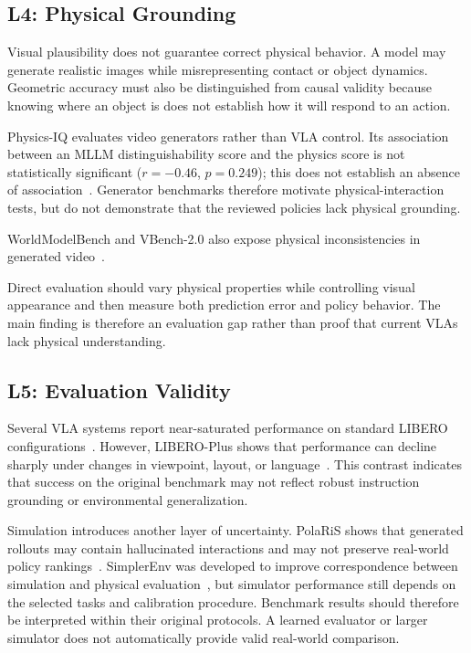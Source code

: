 \documentclass{ieeeaccess}
\begin{document}
\subsection{L4: Physical Grounding}
\label{sec:l4}

Visual plausibility does not guarantee correct physical behavior. A model may generate realistic images while misrepresenting contact or object dynamics. Geometric accuracy must also be distinguished from causal validity because knowing where an object is does not establish how it will respond to an action.

\textcolor[RGB]{104,48,148}{Physics-IQ evaluates video generators rather than VLA control. Its association between an MLLM distinguishability score and the physics score is not statistically significant ($r=-0.46$, $p=0.249$); this does not establish an absence of association~\cite{physicsiq}. Generator benchmarks therefore motivate physical-interaction tests, but do not demonstrate that the reviewed policies lack physical grounding.}

\textcolor[RGB]{104,48,148}{WorldModelBench and VBench-2.0 also expose physical inconsistencies in generated video~\cite{wmbench,vbench2}.}

Direct evaluation should vary physical properties while controlling visual appearance and then measure both prediction error and policy behavior. The main finding is therefore an evaluation gap rather than proof that current VLAs lack physical understanding.

\subsection{L5: Evaluation Validity}
\label{sec:l5}

Several VLA systems report near-saturated performance on standard LIBERO configurations~\cite{openvlaoft,simplevlarl,cosmospolicy}. However, LIBERO-Plus shows that performance can decline sharply under changes in viewpoint, layout, or language~\cite{liberoplus}. This contrast indicates that success on the original benchmark may not reflect robust instruction grounding or environmental generalization.

Simulation introduces another layer of uncertainty. PolaRiS shows that generated rollouts may contain hallucinated interactions and may not preserve real-world policy rankings~\cite{polaris}. SimplerEnv was developed to improve correspondence between simulation and physical evaluation~\cite{simplerenv}, but simulator performance still depends on the selected tasks and calibration procedure. Benchmark results should therefore be interpreted within their original protocols. A learned evaluator or larger simulator does not automatically provide valid real-world comparison.
\end{document}
